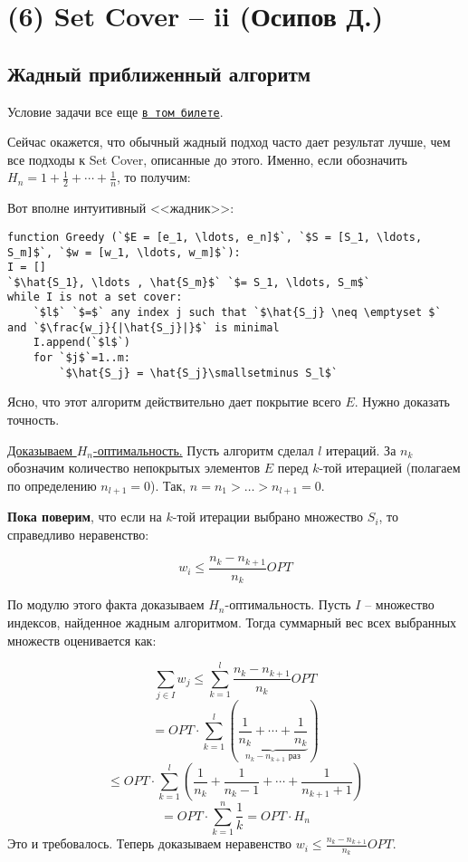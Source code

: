 \section{(6) Set Cover -- ii (Осипов Д.)}
\subsection{Жадный приближенный алгоритм}
Условие задачи все еще \hyperlink{setcover}{\texttt{в том билете}}.

Сейчас окажется, что обычный жадный подход часто дает результат лучше, чем все подходы к Set Cover, описанные до этого. Именно, если обозначить $H_n = 1 + \frac{1}{2} + \cdots + \frac{1}{n}$, то получим:


Вот вполне интуитивный <<жадник>>:

\begin{lstlisting}[escapeinside=``]
function Greedy (`$E = [e_1, \ldots, e_n]$`, `$S = [S_1, \ldots, S_m]$`, `$w = [w_1, \ldots, w_m]$`):
I = []
`$\hat{S_1}, \ldots , \hat{S_m}$` `$= S_1, \ldots, S_m$`
while I is not a set cover:
    `$l$` `$=$` any index j such that `$\hat{S_j} \neq \emptyset $` and `$\frac{w_j}{|\hat{S_j}|}$` is minimal
    I.append(`$l$`)
    for `$j$`=1..m:
        `$\hat{S_j} = \hat{S_j}\smallsetminus S_l$`
\end{lstlisting}

Ясно, что этот алгоритм действительно дает покрытие всего $E$. Нужно доказать точность.

\underline{Доказываем $H_n$-оптимальность.} Пусть алгоритм сделал $l$ итераций. За $n_k$ обозначим количество непокрытых элементов $E$ перед $k$-той итерацией (полагаем по определению $n_{l+1}=0$). Так, $n = n_1 > \ldots > n_{l+1} = 0$. 

\textbf{Пока поверим}, что если на $k$-той итерации выбрано множество $S_i$, то справедливо неравенство:

$$w_i \leq \frac{n_k - n_{k+1}}{n_k}OPT$$

По модулю этого факта доказываем $H_n$-оптимальность. Пусть $I$ -- множество индексов, найденное жадным алгоритмом. Тогда суммарный вес всех выбранных множеств оценивается как:

$$\sum_{j\in I}w_j \leq \sum_{k=1}^l\frac{n_k-n_{k+1}}{n_k} OPT$$
$$ = OPT\cdot\sum_{k=1}^l\left(\underbrace{\frac{1}{n_k} + \cdots + \frac{1}{n_k}}_{n_k-n_{k+1}\text{ раз}}\right)$$
$$ \leq OPT \cdot\sum_{k=1}^l\left(\frac{1}{n_k} + \frac{1}{n_k - 1} + \cdots + \frac{1}{n_{k+1}+1}\right)$$
$$ = OPT\cdot\sum_{k=1}^n\frac{1}{k} = OPT\cdot H_n$$
Это и требовалось. Теперь доказываем неравенство $w_i \leq \frac{n_k - n_{k+1}}{n_k}OPT$.

